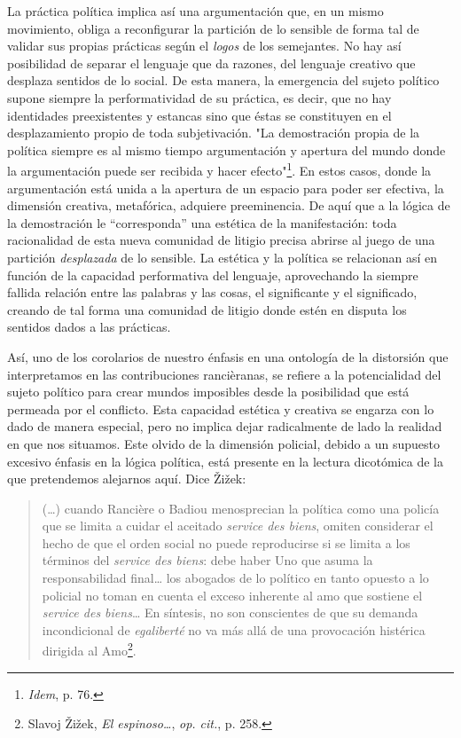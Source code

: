 La práctica política implica así una argumentación que, en un mismo
movimiento, obliga a reconfigurar la partición de lo sensible de forma
tal de validar sus propias prácticas según el \emph{logos} de los
semejantes. No hay así posibilidad de separar el lenguaje que da
razones, del lenguaje creativo que desplaza sentidos de lo social. De
esta manera, la emergencia del sujeto político supone siempre la
performatividad de su práctica, es decir, que no hay identidades
preexistentes y estancas sino que éstas se constituyen en el
desplazamiento propio de toda subjetivación. "La demostración propia de
la política siempre es al mismo tiempo argumentación y apertura del
mundo donde la argumentación puede ser recibida y hacer
efecto"\footnote{\emph{Idem}, p. 76.}. En estos casos, donde la
argumentación está unida a la apertura de un espacio para poder ser
efectiva, la dimensión creativa, metafórica, adquiere preeminencia. De
aquí que a la lógica de la demostración le ``corresponda'' una estética
de la manifestación: toda racionalidad de esta nueva comunidad de
litigio precisa abrirse al juego de una partición \emph{desplazada} de
lo sensible. La estética y la política se relacionan así en función de
la capacidad performativa del lenguaje, aprovechando la siempre fallida
relación entre las palabras y las cosas, el significante y el
significado, creando de tal forma una comunidad de litigio donde estén
en disputa los sentidos dados a las prácticas.

Así, uno de los corolarios de nuestro énfasis en una ontología de la
distorsión que interpretamos en las contribuciones rancièranas, se
refiere a la potencialidad del sujeto político para crear mundos
imposibles desde la posibilidad que está permeada por el conflicto. Esta
capacidad estética y creativa se engarza con lo dado de manera especial,
pero no implica dejar radicalmente de lado la realidad en que nos
situamos. Este olvido de la dimensión policial, debido a un supuesto
excesivo énfasis en la lógica política, está presente en la lectura
dicotómica de la que pretendemos alejarnos aquí. Dice Žižek:

\begin{quote}
(\dots) cuando Rancière o Badiou menosprecian la política como una
policía que se limita a cuidar el aceitado \emph{service des biens},
omiten considerar el hecho de que el orden social no puede reproducirse
si se limita a los términos del \emph{service des biens}: debe haber Uno
que asuma la responsabilidad final\ldots{} los abogados de lo político
en tanto opuesto a lo policial no toman en cuenta el exceso inherente al
amo que sostiene el \emph{service des biens}\ldots{} En síntesis, no son
conscientes de que su demanda incondicional de \emph{egaliberté} no va
más allá de una provocación histérica dirigida al Amo\footnote{Slavoj
  Žižek, \emph{El espinoso\ldots{}}, \emph{op. cit.}, p. 258.}.
\end{quote}

